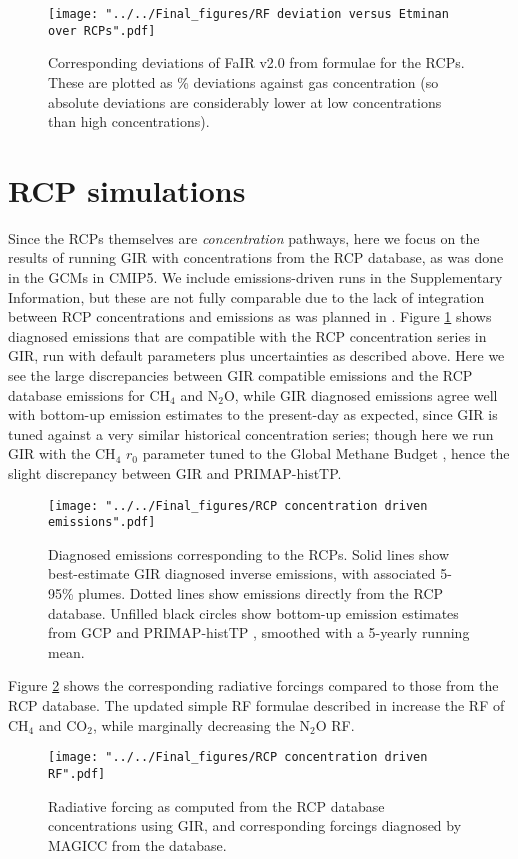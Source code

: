 \documentclass[gmd, manuscript]{copernicus}
\begin{document}
\begin{figure}[t]
    \texttt{[image: "../../Final\_figures/RF deviation versus Etminan over RCPs".pdf]}
    \caption{Corresponding deviations of FaIR v2.0 from \cite{Etminan2016} formulae for the RCPs. These are plotted as \% deviations against gas concentration (so absolute deviations are considerably lower at low concentrations than high concentrations).}
\end{figure}

\section{RCP simulations}
Since the RCPs themselves are \emph{concentration} pathways, here we focus on the results of running GIR with concentrations from the RCP database, as was done in the GCMs in CMIP5. We include emissions-driven runs in the Supplementary Information, but these are not fully comparable due to the lack of integration between RCP concentrations and emissions as was planned in \cite{Moss2010}. Figure \ref{fig:RCPemms} shows diagnosed emissions that are compatible with the RCP concentration series in GIR, run with default parameters plus uncertainties as described above. Here we see the large discrepancies between GIR compatible emissions and the RCP database emissions for CH$_4$ and N$_2$O, while GIR diagnosed emissions agree well with bottom-up emission estimates to the present-day as expected, since GIR is tuned against a very similar historical concentration series; though here we run GIR with the CH$_4$ $r_0$ parameter tuned to the Global Methane Budget \citep{Saunois}, hence the slight discrepancy between GIR and PRIMAP-histTP.
\begin{figure}[t]
    \texttt{[image: "../../Final\_figures/RCP concentration driven emissions".pdf]}
    \caption{Diagnosed emissions corresponding to the RCPs. Solid lines show best-estimate GIR diagnosed inverse emissions, with associated 5-95\% plumes. Dotted lines show emissions directly from the RCP database. Unfilled black circles show bottom-up emission estimates from GCP and PRIMAP-histTP \citep{Quere2018,Gutschow2016}, smoothed with a 5-yearly running mean.}
    \label{fig:RCPemms}
\end{figure}
Figure \ref{fig:RCPRF} shows the corresponding radiative forcings compared to those from the RCP database. The updated simple RF formulae described in \cite{Etminan2016} increase the RF of CH$_4$ and CO$_2$, while marginally decreasing the N$_2$O RF.
\begin{figure}[t]
    \texttt{[image: "../../Final\_figures/RCP concentration driven RF".pdf]}
    \caption{Radiative forcing as computed from the RCP database concentrations using GIR, and corresponding forcings diagnosed by MAGICC from the database.}
    \label{fig:RCPRF}
\end{figure}
\end{document}
